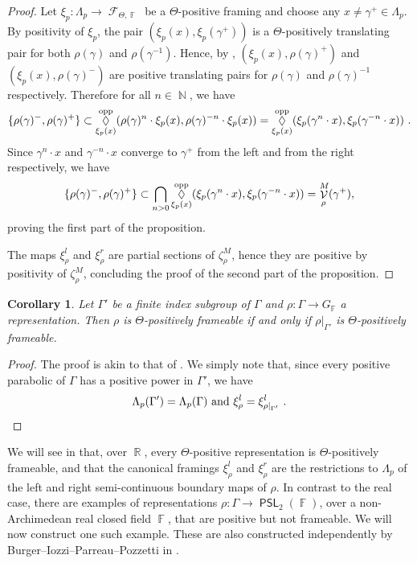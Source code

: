 \documentclass{amsart}
\theoremstyle{plain}
\newtheorem{corollary}[proposition]{Corollary}
\theoremstyle{definition}
\DeclareMathOperator{\PSL}{\mathsf{PSL}}
\DeclareMathOperator{\Diam}{\lozenge}
\newcommand{\bdext}{{\Vc^M_\rho}}
\DeclareMathOperator{\Fc}{\mathcal{F}}
\DeclareMathOperator{\Vc}{\mathcal{V}}
\DeclareMathOperator{\Fb}{{\mathbb{F}}}
\DeclareMathOperator{\Nb}{{\mathbb{N}}}
\DeclareMathOperator{\Rb}{{\mathbb{R}}}
\newcommand{\opp}{\textnormal{opp}}
\newcommand{\1}{\mathbf{1}}
\begin{document}
\begin{proof} 
Let $\xi_p\colon \Lambda_p \to \Fc_{\Theta,\Fb}$ be a $\Theta$-positive framing and choose any $x \neq \gamma^+ \in \Lambda_p$.
By positivity of $\xi_p$, the pair $(\xi_p(x), \xi_p(\gamma^+))$ is a $\Theta$-positively translating pair for both $\rho(\gamma)$ and $\rho(\gamma^{-1})$.
Hence, by , $(\xi_p(x), \rho(\gamma)^+)$ and $(\xi_p(x), \rho(\gamma)^-)$ are positive translating pairs for $\rho(\gamma)$ and $\rho(\gamma)^{-1}$ respectively.
Therefore for all $n\in\Nb$, we have
    \[\{\rho(\gamma)^-, \rho(\gamma)^+\} \subset \Diam_{\xi_p(x)}^\opp(\rho(\gamma)^n \cdot \xi_p(x), \rho(\gamma)^{-n}\cdot \xi_p(x)) = \Diam_{\xi_p(x)}^\opp(\xi_p(\gamma^n \cdot x), \xi_p(\gamma^{-n}\cdot x))~.\]
Since $\gamma^n\cdot x$ and $\gamma^{-n} \cdot x$ converge to $\gamma^+$ from the left and from the right respectively, we have
    \[\{\rho(\gamma)^-, \rho(\gamma)^+\} \subset\bigcap_{n>0}\Diam_{\xi_p(x)}^\opp(\xi_p(\gamma^n\cdot x), \xi_p(\gamma^{-n}\cdot x)) = \bdext (\gamma^+),\]
    proving the first part of the proposition.

    The maps $\xi_\rho^l$ and $\xi_\rho^r$ are partial sections of $\zeta_\rho^M$, hence they are positive by positivity of $\zeta_\rho^M$, concluding the proof of the second part of the proposition.
    
\end{proof}

\begin{corollary}\label{corollary: fi frameable}
    Let $\Gamma'$ be a finite index subgroup of $\Gamma$ and $\rho \colon \Gamma \to G_{\Fb}$ a representation.
    Then $\rho$ is $\Theta$-positively frameable if and only if $\rho\vert_{ \Gamma'}$ is $\Theta$-positively frameable.
\end{corollary}
\begin{proof}
    The proof is akin to that of . We simply note that, since every positive parabolic of $\Gamma$ has a positive power in $\Gamma'$, we have
    \[\Lambda_p(\Gamma') = \Lambda_p(\Gamma )\textrm{ and }\xi_\rho^l = \xi_{\rho\vert_{\Gamma'}}^l~.\qedhere\]
\end{proof}

We will see in  that, over $\Rb$, every $\Theta$-positive representation is $\Theta$-positively frameable, and that the canonical framings $\xi_\rho^l$ and $\xi_\rho^r$ are the restrictions to $\Lambda_p$ of the left and right semi-continuous boundary maps of $\rho$. In contrast to the real case, there are examples of representations $\rho \colon \Gamma \to \PSL_2(\Fb)$, over a non-Archimedean real closed field $\Fb$, that are positive but not frameable. We will now construct one such example. These are also constructed independently by Burger--Iozzi--Parreau--Pozzetti in \cite{BIPP_RSCMaximalRepr}.
\end{document}
